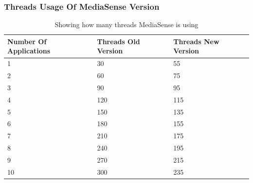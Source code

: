 \subsubsection{Threads Usage Of MediaSense Version}
\begin{table}[H]
\begin{center}
    \begin{tabular}[t!]{ | l | l | l |}
    \hline
    Number Of Applications								& Threads Old Version			& Threads New Version\\ \hline
    1 													& 30							& 55\\ \hline
    2 													& 60							& 75\\ \hline
    3 													& 90							& 95\\ \hline
    4 													& 120							& 115\\ \hline
    5 													& 150							& 135\\ \hline
    6 													& 180							& 155\\ \hline
    7 													& 210							& 175\\ \hline
    8 													& 240							& 195\\ \hline
    9 													& 270							& 215\\ \hline
    10 													& 300							& 235\\ \hline
    \end{tabular}
    \caption{Showing how many threads MediaSense is using}
    \label{tab:threads}
\end{center}
\end{table}
\clearpage

